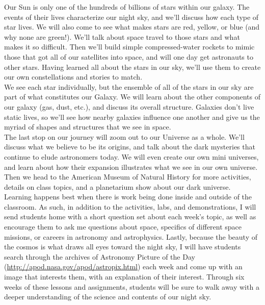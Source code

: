Our Sun is only one of the hundreds of billions of stars within our galaxy. The events of their lives characterize our night sky, and we'll discuss how each type of star lives. We will also come to see what makes stars are red, yellow, or blue (and why none are green!). We'll talk about space travel to those stars and what makes it so difficult. Then we'll build simple compressed-water rockets to mimic those that got all of our satellites into space, and will one day get astronauts to other stars. Having learned all about the stars in our sky, we'll use them to create our own constellations and stories to match.\\

We see each star individually, but the ensemble of all of the stars in our sky are part of what constitutes our Galaxy. We will learn about the other components of our galaxy (gas, dust, etc.), and discuss its overall structure. Galaxies don't live static lives, so we'll see how nearby galaxies influence one another and give us the myriad of shapes and structures that we see in space.\\

The last stop on our journey will zoom out to our Universe as a whole. We'll discuss what we believe to be its origins, and talk about the dark mysteries that continue to elude astronomers today. We will even create our own mini universes, and learn about how their expansion illustrates what we see in our own universe. Then we head to the American Museum of Natural History for more activities, details on class topics, and a planetarium show about our dark universe.\\

Learning happens best when there is work being done inside and outside of the classroom. As such, in addition to the activities, labs, and demonstrations, I will send students home with a short question set about each week's topic, as well as encourage them to ask me questions about space, specifics of different space missions, or careers in astronomy and astrophysics. Lastly, because the beauty of the cosmos is what draws all eyes toward the night sky, I will have students search through the archives of Astronomy Picture of the Day (\url{http://apod.nasa.gov/apod/astropix.html}) each week and come up with an image that interests them, with an explanation of their interest. Through six weeks of these lessons and assignments, students will be sure to walk away with a deeper understanding of the science and contents of our night sky.

